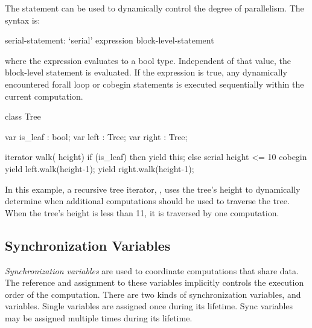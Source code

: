 The  statement can be used to dynamically control the
degree of parallelism.  The syntax is:
\begin{syntax}
serial-statement:
  `serial' expression block-level-statement
\end{syntax}
where the expression evaluates to a bool type.  Independent of that
value, the block-level statement is evaluated. If the expression is
true, any dynamically encountered forall loop or cobegin statements is
executed sequentially within the current computation.


\begin{example}
\begin{chapel}      
class Tree {
  var is_leaf : bool;
  var left    : Tree;
  var right   : Tree;

 iterator walk( height) {
  if (is_leaf) then
    yield this;
  else
    serial height <= 10 cobegin {
      yield left.walk(height-1);
      yield right.walk(height-1);
    }
 }
}
\end{chapel}
In this example, a recursive tree iterator, , uses the
tree's height to dynamically determine when additional computations
should be used to traverse the tree. When the tree's height is less
than 11, it is traversed by one computation.
\end{example}




\subsection{Synchronization Variables}
\label{Synchronization_Variables}

{\em Synchronization variables} are used to coordinate computations
that share data.  The reference and assignment to these variables
implicitly controls the execution order of the computation. 
There are two kinds of synchronization variables,
 and  variables. Single variables are
assigned once during its lifetime. Sync variables may be assigned
multiple times during its lifetime.

